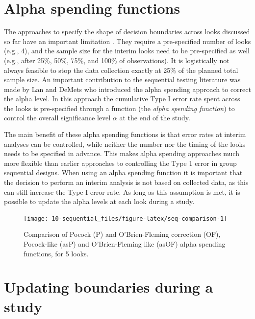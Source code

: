 \documentclass[
  oneside]{krantz}
\begin{document}
\hypertarget{alpha-spending-functions}{%
\section{Alpha spending functions}\label{alpha-spending-functions}}

The approaches to specify the shape of decision boundaries across looks discussed so far have an important limitation \citep{proschan_statistical_2006}. They require a pre-specified number of looks (e.g., 4), and the sample size for the interim looks need to be pre-specified as well (e.g., after 25\%, 50\%, 75\%, and 100\% of observations). It is logistically not always feasible to stop the data collection exactly at 25\% of the planned total sample size. An important contribution to the sequential testing literature was made by Lan and DeMets \citeyearpar{lan_discrete_1983} who introduced the alpha spending approach to correct the alpha level. In this approach the cumulative Type I error rate spent across the looks is pre-specified through a function (the \emph{alpha spending function}) to control the overall significance level \(\alpha\) at the end of the study.

The main benefit of these alpha spending functions is that error rates at interim analyses can be controlled, while neither the number nor the timing of the looks needs to be specified in advance. This makes alpha spending approaches much more flexible than earlier approaches to controlling the Type 1 error in group sequential designs. When using an alpha spending function it is important that the decision to perform an interim analysis is not based on collected data, as this can still increase the Type I error rate. As long as this assumption is met, it is possible to update the alpha levels at each look during a study.



\begin{figure}

{\centering \texttt{[image: 10-sequential\_files/figure-latex/seq-comparison-1]} 

}

\caption{Comparison of Pocock (P) and O'Brien-Fleming correction (OF), Pocock-like (asP) and O'Brien-Fleming like (asOF) alpha spending functions, for 5 looks.}\label{fig:seq-comparison}
\end{figure}

\hypertarget{updating-boundaries-during-a-study}{%
\section{Updating boundaries during a study}\label{updating-boundaries-during-a-study}}
\end{document}
